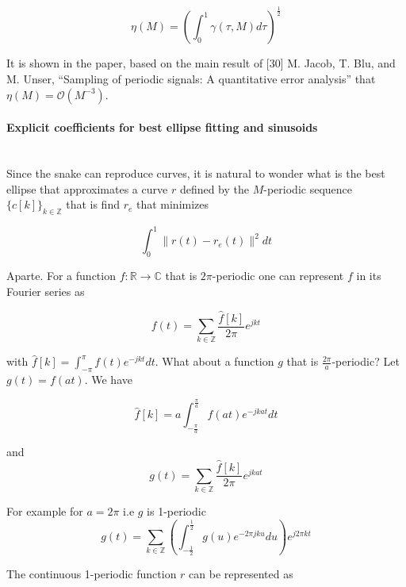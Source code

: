 \documentclass[a4paper, 11pt]{article}
\begin{document}
\begin{equation}
  \eta(M) = {\left(\int_0^1 \gamma(\tau, M) d\tau\right)}^{\frac{1}{2}}
\end{equation}

It is shown in the paper, based on the main result of [30] M. Jacob, T. Blu, and M. Unser, “Sampling of periodic 
signals: A quantitative error analysis” that $\eta(M) = \mathcal{O}(M^{-3})$. 

\paragraph{Explicit coefficients for best ellipse fitting and sinusoids} \mbox{} \\

Since the snake can reproduce curves, it is natural to wonder what is the best ellipse that approximates a curve $r$ 
defined by the $M$-periodic sequence ${\{c[k]\}}_{k \in \mathbb{Z}}$ that is find $r_e$ that minimizes

\begin{equation*}
  \int_0^1 \|r(t) - r_e(t)\|^2 dt
\end{equation*}

Aparte. For a function $f: \mathbb{R} \to \mathbb{C}$ that is $2\pi$-periodic one can represent $f$ in its Fourier 
series as 

\begin{equation*}
  f(t) = \sum_{k \in \mathbb{Z}} \frac{\hat{f}[k]}{2\pi} e^{jkt}
\end{equation*}

with $\hat{f}[k] = \int_{-\pi}^{\pi} f(t)e^{-jkt} dt$. What about a function $g$ that is $\frac{2\pi}{a}$-periodic? Let 
$g(t) = f(at)$. We have

\begin{equation*}
  \hat{f}[k] = a\int_{-\frac{\pi}{a}}^{\frac{\pi}{a}} f(at)e^{-jkat} dt
\end{equation*}

and
\begin{equation*}
  g(t) = \sum_{k \in \mathbb{Z}} \frac{\hat{f}[k]}{2\pi} e^{jkat}
\end{equation*}

For example for $a = 2\pi$ i.e $g$ is 1-periodic
\begin{equation*}
  g(t) = \sum_{k \in \mathbb{Z}} \left(\int_{-\frac{1}{2}}^{\frac{1}{2}} g(u)e^{-2\pi j ku}du\right)  e^{j2\pi kt}
\end{equation*}

The continuous 1-periodic function $r$ can be represented as 
\end{document}
